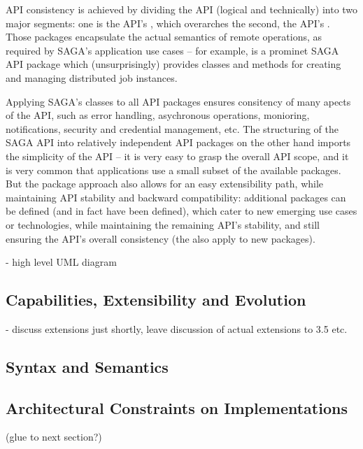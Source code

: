   API consistency is achieved by dividing the API (logical and
  technically) into two major segments: one is the API's \I{\lf},
  which overarches the second, the API's .
  Those packages encapsulate the actual semantics of remote
  operations, as required by SAGA's application use cases -- for
  example,  is a prominet SAGA API package which
  (unsurprisingly) provides classes and methods for creating and
  managing distributed job instances.

  Applying SAGA's \lf classes to all API packages ensures consitency
  of many apects of the API, such as error handling, asychronous
  operations, monioring, notifications, security and credential
  management, etc.  The structuring of the SAGA API into relatively
  independent API packages on the other hand imports the simplicity of
  the API -- it is very easy to grasp the overall API scope, and it is
  very common that applications use a small subset of the available
  packages.  But the package approach also allows for an easy
  extensibility path, while maintaining API stability and backward
  compatibility: additional packages can be defined (and in fact have
  been defined), which cater to new emerging use cases or
  technologies, while maintaining the remaining API's stability, and
  still ensuring the API's overall consistency (the \lf also apply to
  new packages).

  - high level UML diagram\\


 \subsection{Capabilities, Extensibility and Evolution}
  - discuss extensions just shortly, leave discussion of actual extensions to
  3.5 etc.\\
  

 \subsection{Syntax and Semantics}


 \subsection{Architectural Constraints on Implementations}
   (glue to next section?)


